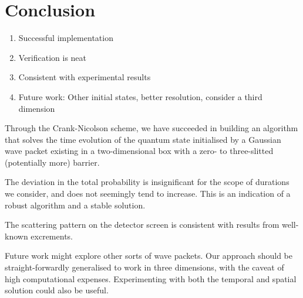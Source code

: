 \section{Conclusion}\label{sec:conclusion}

\begin{enumerate}
    \item Successful implementation
    \item Verification is neat
    \item Consistent with experimental results
    \item Future work: Other initial states, better resolution, consider a third dimension
\end{enumerate}


Through the Crank-Nicolson scheme, we have succeeded in building an algorithm that solves the time evolution of the quantum state initialised by a Gaussian wave packet existing in a two-dimensional box with a zero- to three-slitted (potentially more) barrier.

The deviation in the total probability is insignificant for the scope of durations we consider, and does not seemingly tend to increase. This is an indication of a robust algorithm and a stable solution.

The scattering pattern on the detector screen is consistent with results from well-known excrements.

Future work might explore other sorts of wave packets. Our approach should be straight-forwardly generalised to work in three dimensions, with the caveat of high computational expenses. Experimenting with both the temporal and spatial solution could also be useful.



